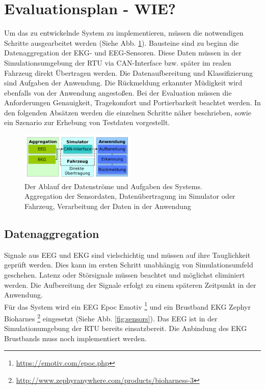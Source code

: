 {\section{Evaluationsplan - WIE?}
\label{chap:eval}
Um das zu entwickelnde System zu implementieren, müssen die notwendigen Schritte ausgearbeitet werden (Siehe Abb. \ref{fig:block}). Bausteine sind zu beginn die Datenaggregation der EKG- und EEG-Sensoren. Diese Daten müssen in der Simulationsumgebung der \acl{RTU} via CAN-Interface bzw. später im realen Fahrzeug direkt Übertragen werden. Die Datenaufbereitung und Klassifizierung sind Aufgaben der Anwendung. Die Rückmeldung erkannter Müdigkeit wird ebenfalls von der Anwendung angestoßen. 
Bei der Evaluation müssen die Anforderungen Genauigkeit, Tragekomfort und Portierbarkeit beachtet werden. In den folgenden Absätzen werden die einzelnen Schritte näher beschrieben, sowie ein Szenario zur Erhebung von Testdaten vorgestellt.

\begin{figure}[h] 
  \begin{center}
    \includegraphics[width=5.5cm]{img/block}
    \caption{Der Ablauf der Datenströme und Aufgaben des Systems. Aggregation der Sensordaten, Datenübertragung im Simulator oder Fahrzeug, Verarbeitung der Daten in der Anwendung}
    \label{fig:block}
  \end{center}
\end{figure}

\subsection{Datenaggregation}
Signale aus EEG und EKG sind vielschichtig und müssen auf ihre Tauglichkeit geprüft werden. Dies kann im ersten Schritt unabhängig von Simulationsumfeld geschehen. Latenz oder Störsignale müssen beachtet und möglichst eliminiert werden. Die Aufbereitung der Signale erfolgt zu einem späteren Zeitpunkt in der Anwendung. \\

Für das System wird ein EEG Epoc Emotiv \footnote{\url{https://emotiv.com/epoc.php}} und ein Brustband EKG Zephyr Bioharnes \footnote{\url{http://www.zephyranywhere.com/products/bioharness-3}} eingesetzt (Siehe Abb. \ref{fig:sensors}). Das EEG ist in der Simulationumgebung der \acl{RTU} bereits einsatzbereit. Die Anbindung des EKG Brustbands muss noch implementiert werden.

}

